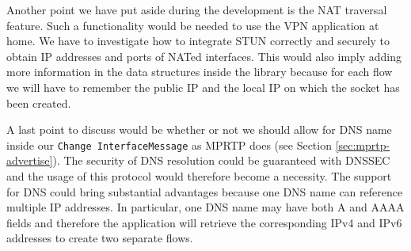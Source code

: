 Another point we have put aside during the development is the NAT traversal feature. Such a functionality would be needed to use the VPN application at home. We have to investigate how to integrate STUN \cite{RFC5389} correctly and securely to obtain IP addresses and ports of NATed interfaces. This would also imply adding more information in the data structures inside the library because for each flow we will have to remember the public IP and the local IP on which the socket has been created.

A last point to discuss would be whether or not we should allow for DNS name inside our \texttt{Change InterfaceMessage} as MPRTP does (see Section \ref{sec:mprtp-advertise}). The security of DNS resolution could be guaranteed with DNSSEC \cite{RFC6840} and the usage of this protocol would therefore become a necessity. The support for DNS could bring substantial advantages because one DNS name can reference multiple IP addresses. In particular, one DNS name may have both A and AAAA fields and therefore the application will retrieve the corresponding IPv4 and IPv6 addresses to create two separate flows.


